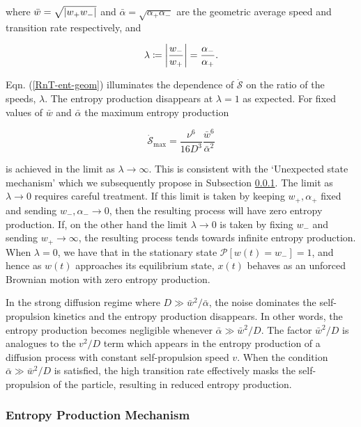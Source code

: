 where $\bar{w} = \sqrt{\abs{w_+w_-}}$ and $\bar{\alpha} = \sqrt{\alpha_+\alpha_-}$ are the geometric average speed and transition rate respectively, and

\begin{equation}
  \lambda \coloneqq \abs{\frac{w_-}{w_+}} = \frac{\alpha_-}{\alpha_+}.
\end{equation}

Eqn. (\ref{RnT-ent-geom}) illuminates the dependence of $\dot{\mathcal{S}}$ on the ratio of the speeds, $\lambda$. The entropy production disappears at $\lambda = 1$ as expected. For fixed values of $\bar{w}$ and $\bar{\alpha}$ the maximum entropy production

\begin{equation}\label{max_entropy}
  \dot{\mathcal{S}}_{\text{max}} = \frac{\nu^6}{16D^3}\frac{\bar{w}^6}{\bar{\alpha}^2}
\end{equation}

is achieved in the limit as $\lambda \rightarrow \infty$. This is consistent with the `Unexpected state mechanism' which we subsequently propose in Subsection \ref{EPmechanism}. The limit as $\lambda \rightarrow 0$ requires careful treatment. If this limit is taken by keeping $w_+, \alpha_+$ fixed and sending $w_-,\alpha_- \rightarrow 0$, then the resulting process will have zero entropy production. If, on the other hand the limit $\lambda \rightarrow 0$ is taken by fixing $w_-$ and sending $w_+ \rightarrow \infty$, the resulting process tends towards infinite entropy production. When $\lambda = 0$, we have that in the stationary state 
$\mathcal{P}\left[w(t) = w_-\right] = 1$, and hence as $w(t)$ approaches its equilibrium state, $x(t)$ behaves as an unforced Brownian motion with zero entropy production.

In the strong diffusion regime where $D \gg \bar{w}^2/\bar{\alpha}$, the noise dominates the self-propulsion kinetics and the entropy production disappears. In other words, the entropy production becomes negligible whenever $\bar{\alpha} \gg \bar{w}^2/D$. The factor $\bar{w}^2/D$ is analogues to the $v^2/D$ term which appears in the entropy production of a diffusion process with constant self-propulsion speed $v$\cite{cocconi2020entropy}. When the condition $\bar{\alpha} \gg \bar{w}^2/D$ is satisfied, the high transition rate effectively masks the self-propulsion of the particle, resulting in reduced entropy production.

\subsubsection{Entropy Production Mechanism}\label{EPmechanism}

